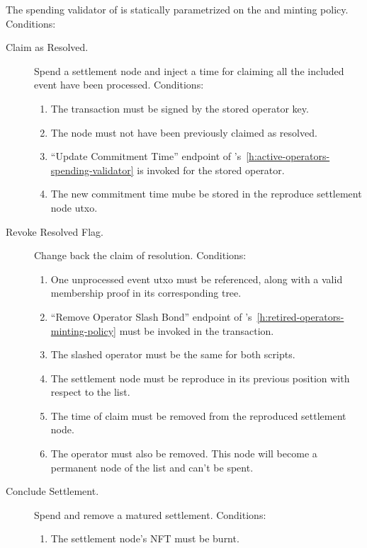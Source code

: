 \documentclass[../midgard.tex]{subfiles}
\begin{document}
The spending validator of  is statically parametrized on the  and  minting policy.
Conditions:
\begin{description}
    \item[Claim as Resolved.] Spend a settlement node and inject a time for claiming all the included event have been processed.
      Conditions:
        \begin{enumerate}
            \item The transaction must be signed by the stored operator key.
            \item The node must not have been previously claimed as resolved.
            \item ``Update Commitment Time'' endpoint of 's~\ref{h:active-operators-spending-validator} is invoked for the stored operator.
            \item The new commitment time mube be stored in the reproduce settlement node utxo.
        \end{enumerate}
    \item[Revoke Resolved Flag.] Change back the claim of resolution.
      Conditions:
        \begin{enumerate}
            \item One unprocessed event utxo must be referenced, along with a valid membership proof in its corresponding tree.
            \item ``Remove Operator Slash Bond'' endpoint of 's~\ref{h:retired-operators-minting-policy} must be invoked in the transaction.
            \item The slashed operator must be the same for both scripts.
            \item The settlement node must be reproduce in its previous position with respect to the  list.
            \item The time of claim must be removed from the reproduced settlement node.
            \item The operator must also be removed. This node will become a permanent node of the  list and can't be spent.
        \end{enumerate}
    \item[Conclude Settlement.] Spend and remove a matured settlement.
      Conditions:
        \begin{enumerate}
            \item The settlement node's NFT must be burnt.
        \end{enumerate}
\end{description}
\end{document}

